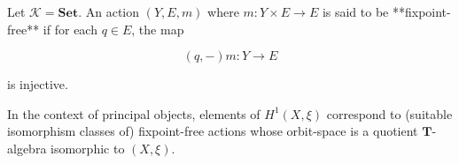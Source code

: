 Let $\mathcal{K} = \mathbf{Set}$. An action $(Y, E, m)$ where $m: Y \times E \rightarrow E$ is said to be **fixpoint-free** if for each $q \in E$, the map

$$(q, -)m: Y \rightarrow E$$

is injective.

In the context of principal objects, elements of $H^1(X, \xi)$ correspond to (suitable isomorphism classes of) fixpoint-free actions whose orbit-space is a quotient $\mathbf{T}$-algebra isomorphic to $(X, \xi)$.

